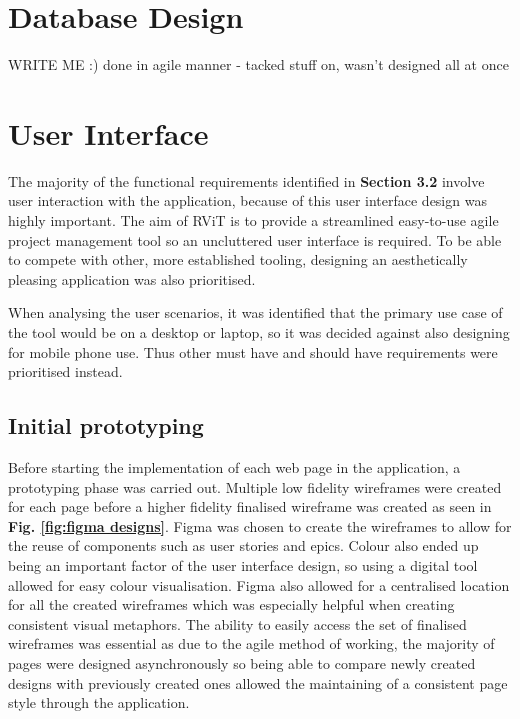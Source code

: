 \documentclass[l4proj.tex]{subfiles}
\begin{document}

\section{Database Design}
WRITE ME :)
done in agile manner - tacked stuff on, wasn't designed all at once

\section{User Interface}
The majority of the functional requirements identified in \textbf{Section 3.2} involve user interaction with the application, because of this user interface design was highly important. The aim of RViT is to provide a streamlined easy-to-use agile project management tool so an uncluttered user interface is required. To be able to compete with other, more established tooling, designing an aesthetically pleasing application was also prioritised. 

When analysing the user scenarios, it was identified that the primary use case of the tool would be on a desktop or laptop, so it was decided against also designing for mobile phone use. Thus other must have and should have requirements were prioritised instead.


\subsection{Initial prototyping}
Before starting the implementation of each web page in the application, a prototyping phase was carried out. Multiple low fidelity wireframes were created for each page before a higher fidelity finalised wireframe was created as seen in \textbf{Fig. \ref{fig:figma designs}}. Figma was chosen to create the wireframes to allow for the reuse of components such as user stories and epics. Colour also ended up being an important factor of the user interface design, so using a digital tool allowed for easy colour visualisation. Figma also allowed for a centralised location for all the created wireframes which was especially helpful when creating consistent visual metaphors. The ability to easily access the set of finalised wireframes was essential as due to the agile method of working, the majority of pages were designed asynchronously so being able to compare newly created designs with previously created ones allowed the maintaining of a consistent page style through the application. 
\end{document}
